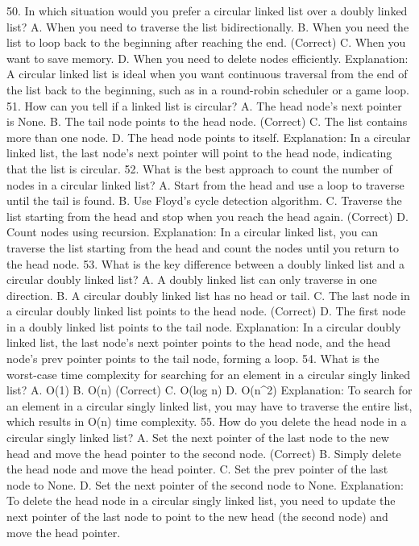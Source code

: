 50. In which situation would you prefer a circular linked list over a doubly linked list?
A. When you need to traverse the list bidirectionally.
B. When you need the list to loop back to the beginning after reaching the end. (Correct)
C. When you want to save memory.
D. When you need to delete nodes efficiently.
Explanation: A circular linked list is ideal when you want continuous traversal from the end of the list back to the beginning, such as in a round-robin scheduler or a game loop.
51. How can you tell if a linked list is circular?
A. The head node’s next pointer is None.
B. The tail node points to the head node. (Correct)
C. The list contains more than one node.
D. The head node points to itself.
Explanation: In a circular linked list, the last node’s next pointer will point to the head node, indicating that the list is circular.
52. What is the best approach to count the number of nodes in a circular linked list?
A. Start from the head and use a loop to traverse until the tail is found.
B. Use Floyd’s cycle detection algorithm.
C. Traverse the list starting from the head and stop when you reach the head again. (Correct)
D. Count nodes using recursion.
Explanation: In a circular linked list, you can traverse the list starting from the head and count the nodes until you return to the head node.
53. What is the key difference between a doubly linked list and a circular doubly linked list?
A. A doubly linked list can only traverse in one direction.
B. A circular doubly linked list has no head or tail.
C. The last node in a circular doubly linked list points to the head node. (Correct)
D. The first node in a doubly linked list points to the tail node.
Explanation: In a circular doubly linked list, the last node’s next pointer points to the head node, and the head node’s prev pointer points to the tail node, forming a loop.
54. What is the worst-case time complexity for searching for an element in a circular singly linked list?
A. O(1)
B. O(n) (Correct)
C. O(log n)
D. O(n^2)
Explanation: To search for an element in a circular singly linked list, you may have to traverse the entire list, which results in O(n) time complexity.
55. How do you delete the head node in a circular singly linked list?
A. Set the next pointer of the last node to the new head and move the head pointer to the second node. (Correct)
B. Simply delete the head node and move the head pointer.
C. Set the prev pointer of the last node to None.
D. Set the next pointer of the second node to None.
Explanation: To delete the head node in a circular singly linked list, you need to update the next pointer of the last node to point to the new head (the second node) and move the head pointer.
